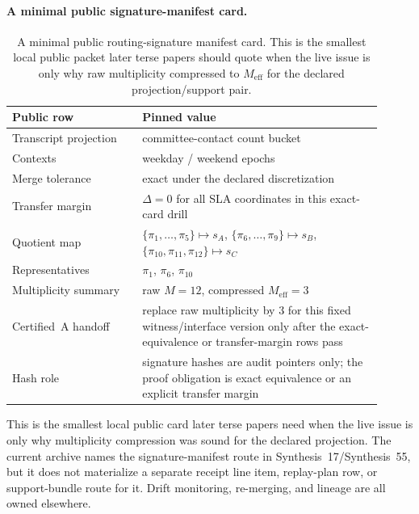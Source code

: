 \documentclass[11pt]{article}
\begin{document}
\paragraph{A minimal public signature-manifest card.}
\begin{table}[t]
\centering
\small
\begin{tabular}{@{}p{0.32\linewidth}p{0.59\linewidth}@{}}
\toprule
\textbf{Public row} & \textbf{Pinned value}\\
\midrule
Transcript projection & committee-contact count bucket \\
Contexts & weekday / weekend epochs \\
Merge tolerance & exact under the declared discretization \\
Transfer margin & $\Delta=0$ for all SLA coordinates in this exact-card drill \\
Quotient map & $\{\pi_1,\ldots,\pi_5\}\mapsto s_A$, $\{\pi_6,\ldots,\pi_9\}\mapsto s_B$, $\{\pi_{10},\pi_{11},\pi_{12}\}\mapsto s_C$ \\
Representatives & $\pi_1$, $\pi_6$, $\pi_{10}$ \\
Multiplicity summary & raw $M=12$, compressed $M_{\mathrm{eff}}=3$ \\
Certified~A handoff & replace raw multiplicity by $3$ for this fixed witness/interface version only after the exact-equivalence or transfer-margin rows pass \\
Hash role & signature hashes are audit pointers only; the proof obligation is exact equivalence or an explicit transfer margin \\
\bottomrule
\end{tabular}
\caption{A minimal public routing-signature manifest card. This is the smallest local public packet later terse papers should quote when the live issue is only why raw multiplicity compressed to $M_{\mathrm{eff}}$ for the declared projection/support pair.}
\label{tab:minimal-signature-manifest-card}
\end{table}
This is the smallest local public card later terse papers need when the live issue is only why multiplicity compression was sound for the declared projection. The current archive names the signature-manifest route in Synthesis~17/Synthesis~55, but it does not materialize a separate receipt line item, replay-plan row, or support-bundle route for it. Drift monitoring, re-merging, and lineage are all owned elsewhere.\cite{series:workedexample,series:seriesspines}
\end{document}

